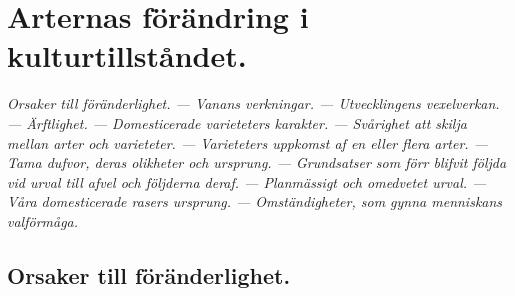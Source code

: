 


\chapter[Kulturtillståndet]{Arternas förändring i kulturtillståndet.}

{\it
Orsaker till föränderlighet. — Vanans verkningar. — Utvecklingens vexelverkan. — Ärftlighet. — Domesticerade varieteters karakter. — Svårighet att skilja mellan arter och varieteter. — Varieteters uppkomst af en eller flera arter. — Tama dufvor, deras olikheter och ursprung. — Grundsatser som förr blifvit följda vid urval till afvel och följderna deraf. — Planmässigt och omedvetet urval. — Våra domesticerade rasers ursprung. — Omständigheter, som gynna menniskans valförmåga.
}


\section{Orsaker till föränderlighet.}

